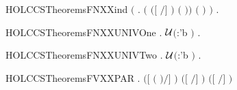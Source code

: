 \begin{SaveVerbatim}{HOLCCSTheoremsFNXXind}
       \ensuremath{(}\HOLSymConst{\HOLTokenForall{}}  .
            \ensuremath{(}   \HOLSymConst{\HOLTokenImp{}}  \ensuremath{(}\ensuremath{[}  \ensuremath{/}\ensuremath{]} \ensuremath{)} \ensuremath{(}  \ensuremath{)}\ensuremath{)} \HOLSymConst{\HOLTokenImp{}}
             \ensuremath{(}  \ensuremath{)} \ensuremath{)} \HOLSymConst{\HOLTokenImp{}}
       \HOLSymConst{\HOLTokenForall{}} .   
\end{SaveVerbatim}
\newcommand{\HOLCCSTheoremsFNXXind}{\UseVerbatim{HOLCCSTheoremsFNXXind}}
\begin{SaveVerbatim}{HOLCCSTheoremsFNXXUNIVOne}
\HOLTokenTurnstile{} \HOLSymConst{\HOLTokenForall{}}.   \HOLSymConst{\HOLTokenNotEqual{}} \ensuremath{{\cal{U}}}\ensuremath{(}:'b \ensuremath{)} \HOLSymConst{\HOLTokenImp{}} \HOLSymConst{\HOLTokenExists{}}.  \HOLConst{\HOLTokenNotIn{}}  
\end{SaveVerbatim}
\newcommand{\HOLCCSTheoremsFNXXUNIVOne}{\UseVerbatim{HOLCCSTheoremsFNXXUNIVOne}}
\begin{SaveVerbatim}{HOLCCSTheoremsFNXXUNIVTwo}
\HOLTokenTurnstile{} \HOLSymConst{\HOLTokenForall{}} .
         \HOLConst{\HOLTokenUnion{}}   \HOLSymConst{\HOLTokenNotEqual{}} \ensuremath{{\cal{U}}}\ensuremath{(}:'b \ensuremath{)} \HOLSymConst{\HOLTokenImp{}}
       \HOLSymConst{\HOLTokenExists{}}.  \HOLConst{\HOLTokenNotIn{}}   \HOLSymConst{\HOLTokenConj{}}  \HOLConst{\HOLTokenNotIn{}}  
\end{SaveVerbatim}
\newcommand{\HOLCCSTheoremsFNXXUNIVTwo}{\UseVerbatim{HOLCCSTheoremsFNXXUNIVTwo}}
\begin{SaveVerbatim}{HOLCCSTheoremsFVXXPAR}
\HOLTokenTurnstile{} \HOLSymConst{\HOLTokenForall{}}   .
        \ensuremath{(}\ensuremath{[}  \ensuremath{(} \HOLSymConst{\ensuremath{\mid}} \ensuremath{)}\ensuremath{/}\ensuremath{]} \ensuremath{)} \HOLSymConst{\ensuremath{=}}
        \ensuremath{(}\ensuremath{[}  \ensuremath{/}\ensuremath{]} \ensuremath{)} \HOLConst{\HOLTokenUnion{}}  \ensuremath{(}\ensuremath{[}  \ensuremath{/}\ensuremath{]} \ensuremath{)}
\end{SaveVerbatim}
